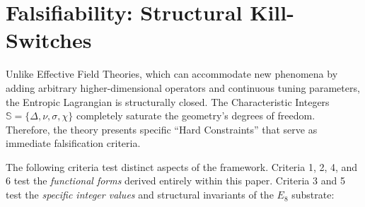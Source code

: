 \section{Falsifiability: Structural Kill-Switches}
\label{sec:falsifiability}

Unlike Effective Field Theories, which can accommodate new phenomena by adding arbitrary higher-dimensional operators and continuous tuning parameters, the Entropic Lagrangian is structurally closed. The Characteristic Integers $\mathbb{S} = \{\Delta, \nu, \sigma, \chi\}$ completely saturate the geometry's degrees of freedom. Therefore, the theory presents specific ``Hard Constraints'' that serve as immediate falsification criteria. 

The following criteria test distinct aspects of the framework. Criteria 1, 2, 4, and 6 test the \textit{functional forms} derived entirely within this paper. Criteria 3 and 5 test the \textit{specific integer values} and structural invariants of the $E_8$ substrate:

